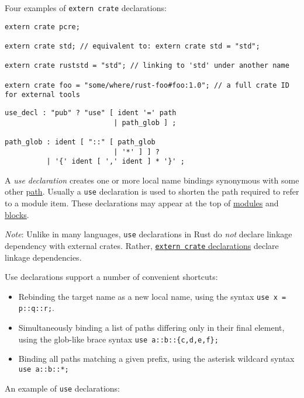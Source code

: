 \documentclass[]{article}
\begin{document}
Four examples of \texttt{extern crate} declarations:

\begin{verbatim}
extern crate pcre;

extern crate std; // equivalent to: extern crate std = "std";

extern crate ruststd = "std"; // linking to 'std' under another name

extern crate foo = "some/where/rust-foo#foo:1.0"; // a full crate ID for external tools
\end{verbatim}


\begin{verbatim}
use_decl : "pub" ? "use" [ ident '=' path
                          | path_glob ] ;

path_glob : ident [ "::" [ path_glob
                          | '*' ] ] ?
          | '{' ident [ ',' ident ] * '}' ;
\end{verbatim}

A \emph{use declaration} creates one or more local name bindings
synonymous with some other \hyperref[paths]{path}. Usually a
\texttt{use} declaration is used to shorten the path required to refer
to a module item. These declarations may appear at the top of
\hyperref[modules]{modules} and \hyperref[blocks]{blocks}.

\emph{Note}: Unlike in many languages, \texttt{use} declarations in Rust
do \emph{not} declare linkage dependency with external crates. Rather,
\hyperref[extern-crate-declarations]{\texttt{extern crate} declarations}
declare linkage dependencies.

Use declarations support a number of convenient shortcuts:

\begin{itemize}
\itemsep1pt\parskip0pt
\item
  Rebinding the target name as a new local name, using the syntax
  \texttt{use x = p::q::r;}.
\item
  Simultaneously binding a list of paths differing only in their final
  element, using the glob-like brace syntax
  \texttt{use a::b::\{c,d,e,f\};}
\item
  Binding all paths matching a given prefix, using the asterisk wildcard
  syntax \texttt{use a::b::*;}
\end{itemize}

An example of \texttt{use} declarations:
\end{document}
